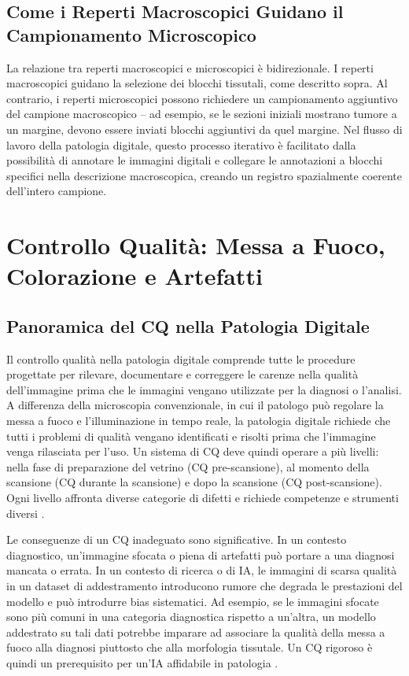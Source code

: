 \subsection{Come i Reperti Macroscopici Guidano il Campionamento Microscopico}

La relazione tra reperti macroscopici e microscopici è bidirezionale. I reperti macroscopici
guidano la selezione dei blocchi tissutali, come descritto sopra. Al contrario, i reperti
microscopici possono richiedere un campionamento aggiuntivo del campione macroscopico -- ad
esempio, se le sezioni iniziali mostrano tumore a un margine, devono essere inviati blocchi
aggiuntivi da quel margine. Nel flusso di lavoro della patologia digitale, questo processo
iterativo è facilitato dalla possibilità di annotare le immagini digitali e collegare le
annotazioni a blocchi specifici nella descrizione macroscopica, creando un registro spazialmente
coerente dell'intero campione.

\section{Controllo Qualità: Messa a Fuoco, Colorazione e Artefatti}
\label{sec:ch2-qc}

\subsection{Panoramica del CQ nella Patologia Digitale}

Il controllo qualità nella patologia digitale comprende tutte le procedure progettate per
rilevare, documentare e correggere le carenze nella qualità dell'immagine prima che le immagini
vengano utilizzate per la diagnosi o l'analisi. A differenza della microscopia convenzionale, in
cui il patologo può regolare la messa a fuoco e l'illuminazione in tempo reale, la patologia
digitale richiede che tutti i problemi di qualità vengano identificati e risolti prima che
l'immagine venga rilasciata per l'uso. Un sistema di CQ deve quindi operare a più livelli: nella
fase di preparazione del vetrino (CQ pre-scansione), al momento della scansione (CQ durante la
scansione) e dopo la scansione (CQ post-scansione). Ogni livello affronta diverse categorie di
difetti e richiede competenze e strumenti diversi \cite{janowczyk2019}.

Le conseguenze di un CQ inadeguato sono significative. In un contesto diagnostico, un'immagine
sfocata o piena di artefatti può portare a una diagnosi mancata o errata. In un contesto di
ricerca o di IA, le immagini di scarsa qualità in un dataset di addestramento introducono rumore
che degrada le prestazioni del modello e può introdurre bias sistematici. Ad esempio, se le
immagini sfocate sono più comuni in una categoria diagnostica rispetto a un'altra, un modello
addestrato su tali dati potrebbe imparare ad associare la qualità della messa a fuoco alla
diagnosi piuttosto che alla morfologia tissutale. Un CQ rigoroso è quindi un prerequisito per
un'IA affidabile in patologia \cite{bankhead2022}.

